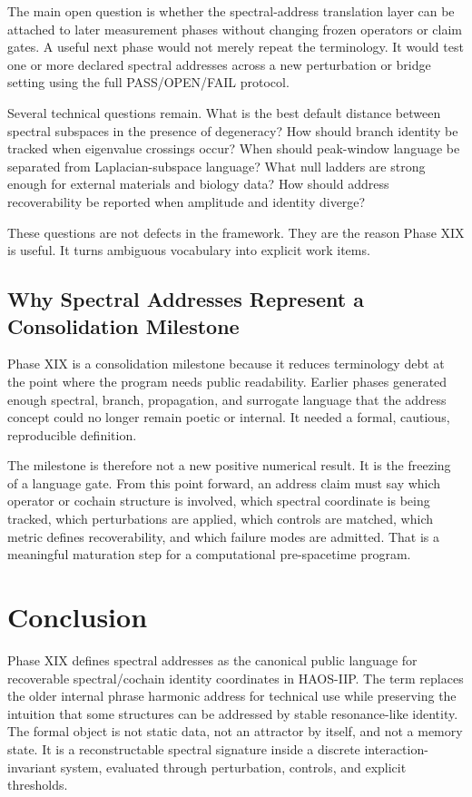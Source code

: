 \documentclass[11pt]{article}
\begin{document}
The main open question is whether the spectral-address translation layer can be attached to later measurement phases without changing frozen operators or claim gates. A useful next phase would not merely repeat the terminology. It would test one or more declared spectral addresses across a new perturbation or bridge setting using the full PASS/OPEN/FAIL protocol.

Several technical questions remain. What is the best default distance between spectral subspaces in the presence of degeneracy? How should branch identity be tracked when eigenvalue crossings occur? When should peak-window language be separated from Laplacian-subspace language? What null ladders are strong enough for external materials and biology data? How should address recoverability be reported when amplitude and identity diverge?

These questions are not defects in the framework. They are the reason Phase XIX is useful. It turns ambiguous vocabulary into explicit work items.

\subsection{Why Spectral Addresses Represent a Consolidation Milestone}

Phase XIX is a consolidation milestone because it reduces terminology debt at the point where the program needs public readability. Earlier phases generated enough spectral, branch, propagation, and surrogate language that the address concept could no longer remain poetic or internal. It needed a formal, cautious, reproducible definition.

The milestone is therefore not a new positive numerical result. It is the freezing of a language gate. From this point forward, an address claim must say which operator or cochain structure is involved, which spectral coordinate is being tracked, which perturbations are applied, which controls are matched, which metric defines recoverability, and which failure modes are admitted. That is a meaningful maturation step for a computational pre-spacetime program.

\section{Conclusion}

Phase XIX defines spectral addresses as the canonical public language for recoverable spectral/cochain identity coordinates in HAOS-IIP. The term replaces the older internal phrase harmonic address for technical use while preserving the intuition that some structures can be addressed by stable resonance-like identity. The formal object is not static data, not an attractor by itself, and not a memory state. It is a reconstructable spectral signature inside a discrete interaction-invariant system, evaluated through perturbation, controls, and explicit thresholds.
\end{document}
